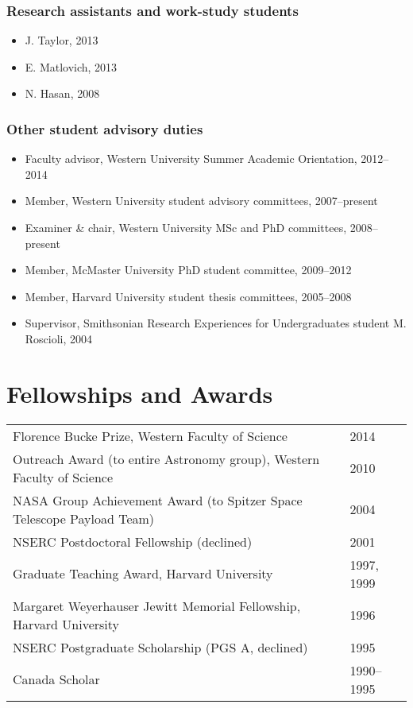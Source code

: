 \documentclass[12pt]{article}
\begin{document}
\subsubsection{Research assistants and work-study students}
\begin{itemize}
\item J. Taylor, 2013
\item E. Matlovich, 2013
\item N. Hasan, 2008
\end{itemize}

\subsubsection{Other student advisory duties}
\begin{itemize}
\item Faculty advisor, Western University Summer Academic Orientation, 2012--2014\\
\item Member, Western University student advisory committees, 2007--present\\
\item Examiner \& chair, Western University MSc and PhD committees, 2008--present\\
\item Member, McMaster University PhD student committee, 2009--2012\\
\item Member, Harvard University student thesis committees, 2005--2008\\
\item Supervisor, Smithsonian Research Experiences for Undergraduates student M. Roscioli, 2004
\end{itemize}

\section{Fellowships and Awards}

\begin{tabular}{ll}
Florence Bucke Prize, Western Faculty of Science & 2014\\
Outreach Award (to entire Astronomy group), Western Faculty of Science & 2010 \\
NASA Group Achievement Award (to Spitzer Space Telescope Payload Team)& 2004\\
NSERC Postdoctoral Fellowship (declined)& 2001 \\
Graduate Teaching Award, Harvard University & 1997, 1999 \\
Margaret Weyerhauser Jewitt Memorial Fellowship, Harvard University & 1996\\
NSERC Postgraduate Scholarship (PGS A, declined) & 1995 \\
Canada Scholar &1990--1995\\
\end{tabular}
\end{document}
